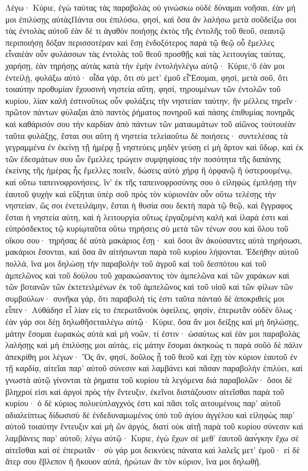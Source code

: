 Λέγω· Κύριε, ἐγὼ ταύτας τὰς παραβολὰς οὐ γινώσκω οὐδὲ δύναμαι νοῆσαι, ἐὰν μή μοι ἐπιλύσῃς αὐτὰςΠάντα σοι ἐπιλύσω, φησί, καὶ ὅσα ἂν λαλήσω μετὰ σοῦδείξω σοι τὰς ἐντολὰς αὐτοῦ ἐὰν δέ τι ἀγαθὸν ποιήσῃς ἐκτὸς τῆς ἐντολῆς τοῦ θεοῦ, σεαυτῷ περιποιήσῃ δόξαν περισσοτέραν καὶ ἔσῃ ἐνδοξότερος παρὰ τῷ θεῷ οὗ ἔμελλες εἶναιἐὰν οὖν φυλάσσων τὰς ἐντολὰς τοῦ θεοῦ προσθῇς καὶ τὰς λειτουγίας ταύτας, χαρήσῃ, ἐὰν τηρήσῃς αὐτὰς κατὰ τὴν ἐμὴν ἐντολήνλέγω αὐτῷ· Κύριε,`ὃ ἐὰν μοι ἐντείλῂ, φυλάξω αὐτό· οἶδα γάρ, ὅτι σὺ μετ’ ἐμοῦ εἶἜσομαι, φησί, μετὰ σοῦ, ὅτι τοιαύτην προθυμίαν ἔχουσινἡ νηστεία αὕτη, φησί, τηρουμένων τῶν ἐντολῶν τοῦ κυρίου, λίαν καλή ἐστινοὕτως οὖν φυλάξεις τὴν νηστείαν ταύτην, ἣν μέλλεις τηρεῖν· πρῶτον πάντων φύλαξαι ἀπὸ παντὸς ῥήματος πονηροῦ καὶ πάσης ἐπιθυμίας πονηρᾶς καὶ καθάρισόν σου τὴν καρδίαν ἀπὸ πάντων τῶν ματαωμάτων τοῦ αἰῶνος τούτουἐὰν ταῦτα φυλάξῃς, ἔσται σοι αὕτη ἡ νηστεία τελείαοὕτω δὲ ποιήσεις· συντελέσας τὰ γεγραμμένα ἐν ἐκείνῃ τῇ ἡμέρᾳ ᾗ νηστεύεις μηδὲν γεύσῃ εἰ μὴ ἄρτον καὶ ὕδωρ, καὶ ἐκ τῶν ἐδεσμάτων σου ὧν ἔμελλες τρώγειν συμψηφίσας τὴν ποσότητα τῆς δαπάνης ἐκείνης τῆς ἡμέρας ἧς ἔμελλες ποιεῖν, δώσεις αὐτὸ χήρᾳ ἢ ὀρφανῷ ἢ ὑστερουμένῳ, καὶ οὕτω ταπεινοφρονήσεις, ἵν’ ἐκ τῆς ταπεινοφροσύνης σου ὁ εἰληφὼς ἐμπλήσῃ τὴν ἑαυτοῦ ψυχὴν καὶ εὔξηται ὑπὲρ σοῦ πρὸς τὸν κύριονἐὰν οὖν οὕτω τελέσῃς τὴν νηστείαν, ὥς σοι ἐνετειλάμην, ἔσται ἡ θυσία σου δεκτὴ παρὰ τῷ θεῷ, καὶ ἔγγραφος ἔσται ἡ νηστεία αὑτη, καὶ ἡ λειτουργία οὕτως ἐργαζομένη καλὴ καὶ ἱλαρά ἐστι καὶ εὐπρόσδεκτος τῷ κυρίῳταῦτα οὕτω τηρήσεις σὺ μετὰ τῶν τένων σου καὶ ὅλου τοῦ οἴκου σου· τηρήσας δὲ αὐτὰ μακάριος ἔσῃ· καὶ ὅσοι ἂν ἀκούσαντες αὐτὰ τηρήσωσι, μακάριοι ἔσονται, καὶ ὅσα ἂν αἰτήσωνται παρὰ τοῦ κυρίου λήψονται.
Ἐδεήθην αὐτοῦ πολλά, ἵνα μοι δηλώσῃ τὴν παραβολὴν τοῦ ἀγροῦ καὶ τοῦ δεσπότου καὶ τοῦ ἀμπελῶνος καὶ τοῦ δούλου τοῦ χαρακώσαντος τὸν ἀμπελῶνα καὶ τῶν χαράκων καὶ τῶν βοτανῶν τῶν ἐκτετειλμένων ἐκ τοῦ ἀμπελῶνος καὶ τοῦ υἱοῦ καὶ τῶν φίλων τῶν συμβούλων· συνῆκα γάρ, ὅτι παραβολή τίς ἐστι ταῦτα πάνταὁ δὲ ἀποκριθείς μοι εἶπεν· Αὐθάδησ εἶ λίαν εἰς το ἐπερωτᾶνοὐκ ὀφείλεις, φησίν, ἐπερωτᾶν οὐδὲν ὅλως· ἐὰν γάρ σοι δέῃ δηλωθῆσεταιλέγω αὐτῷ· Κύριε, ὅσα ἄν μοι δείξῃς καὶ μὴ δηλώσῃς, μάτην ἔσομαι ἑωρακὼς αὐτὰ καὶ μὴ νοῶν, τί ἐστιν· ὡσαύτως καὶ ἐὰν μοι παραβολὰς λαλήσῃς καὶ μὴ ἐπιλύσῃς μοι αὐτάς, εἰς μάτην ἔσομαι ἀκηκοώς τι παρὰ σοῦὁ δὲ πάλιν ἀπεκρίθη μοι λέγων· Ὃς ἂν, φησί, δοῦλος ᾖ τοῦ θεοῦ καὶ ἔχῃ τὸν κύριον ἑαυτοῦ ἐν τῇ καρδίᾳ, αἰτεῖαι παρ’ αὐτοῦ σύνεσιν καὶ λαμβάνει καὶ πᾶσαν παραβολὴν ἐπιλύει, καὶ γνωστὰ αὐτῷ γίνονται τὰ ῥηματα τοῦ κυρίου τὰ λεγόμενα διά παραβολῶν· ὅσοι δὲ βληχροί εἰσι καὶ ἀργοὶ πρὸς τὴν ἔντευξιν, ἐκεῖνοι διστάζουσιν αἰτεῖσθαι παρὰ τοῦ κυρίου· ὁ δὲ κύριος πολυεύπλαγχνός ἐστι καὶ πᾶσι τοῖς αιτουμένοις παρ’ αὐτοῦ αδιαλείπτως δίδωσισὺ δὲ ἐνδεδυναμωμένος ὑπὸ τοῦ ἁγίου ἀγγέλου καὶ εἰληφὼς παρ’ αὐτοῦ τοιαύτην ἔντευξιν καὶ μὴ ὢν ἀργός, διατί οὐκ αἰτῇ παρὰ τοῦ κυρίου σύνεσιν καὶ λαμβάνεις παρ’ αὐτοῦ; λέγω αὐτῷ· Κυριε, ἐγὼ ἔχων σὲ μεθ’ ἑαυτοῦ ἀαν́γκην ἔχω σὲ αἰτεῖσθαι καὶ σὲ ἐπερωτᾶν· σὺ γάρ μοι δεικνύεις πάνατα καὶ λαλεῖς μετ’ ἐμοῦ· εἰ δὲ ἄτερ σου ἔβλεπον ἢ ἤκουον αὐτά, ἠρώτων ἂν τὸν κύριον, ἵνα μοι δηλωθῇ.
